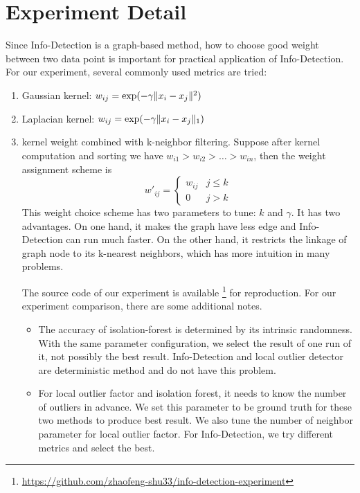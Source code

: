 \documentclass[runningheads]{llncs}
\begin{document}
\section{Experiment Detail}
Since Info-Detection is a graph-based method, how to choose good weight between two data point is important for practical application of Info-Detection. For our experiment, several commonly used metrics are tried: 
\begin{enumerate}
\item Gaussian kernel: $w_{ij} = \exp(-\gamma \lVert x_i - x_j\rVert^2)$
\item Laplacian kernel: $w_{ij} = \exp(-\gamma \lVert x_i - x_j\rVert_1)$
\item kernel weight combined with k-neighbor filtering. Suppose after kernel computation and sorting we have $w_{i1} > w_{i2} > \dots > w_{in}$, then the weight assignment scheme is
$$
w'_{ij}  = 
\begin{cases}
 w_{ij} & j \leq k \\
 0 & j > k
\end{cases}
$$
This weight choice scheme has two parameters to tune: $k$ and $\gamma$. It has two advantages. On one hand, it makes the graph have less edge and Info-Detection can run much faster. On the other hand, it restricts the linkage of graph node to its k-nearest neighbors, which has more intuition in many problems.

The source code of our experiment is available \footnote{\scriptsize\url{https://github.com/zhaofeng-shu33/info-detection-experiment}} for reproduction.
For our experiment comparison, there are some additional notes.
\begin{itemize}
\item The accuracy of isolation-forest is determined by its intrinsic randomness. With the same parameter configuration, we select the result of one run of it, not possibly the best result. Info-Detection and local outlier detector are deterministic method and do not have this problem.
\item For local outlier factor and isolation forest, it needs to know the number of outliers in advance. We set this parameter to be ground truth for these two methods to produce best result. We also tune the number of neighbor parameter for local outlier factor. For Info-Detection, we try different metrics and select the best.
\end{itemize}

\end{enumerate} 
\end{document}
